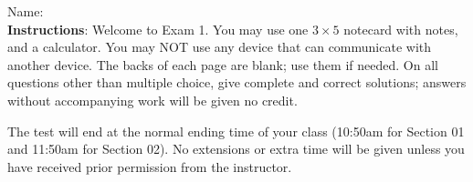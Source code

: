 \documentclass[addpoints]{exam}
\begin{document}
		
\vspace*{0pt}

\noindent
Name: \underline{\hspace{2in}} \\


\noindent
\textbf{Instructions}: Welcome to Exam 1. You may use one $3 \times 5$ notecard with notes, and a calculator. You may NOT use any device that can communicate  with another device. The backs of each page are blank; use them if needed. On all questions other than multiple choice, give complete and correct solutions; answers without accompanying work will be given no credit. 

The test will end at the normal ending time of your class (10:50am for Section 01 and 11:50am for Section 02). No extensions or extra time will be given unless you have received prior permission from the instructor.
\end{document}
